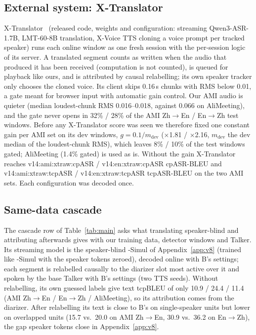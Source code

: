 \subsection{External system: X-Translator}
\label{app:xt}
X-Translator~\citep{zhao2026xtranslator} (released code, weights and configuration: streaming Qwen3-ASR-1.7B, LMT-60-8B
translation, X-Voice TTS cloning a voice prompt per tracked speaker) runs each online window as one fresh session with
the per-session logic of its server. A translated segment counts as written when the audio that produced it has been
received (computation is not counted), is queued for playback like ours, and is attributed by causal relabelling; its
own speaker tracker only chooses the cloned voice. Its client skips 0.16\,s chunks with RMS below 0.01, a gate meant for
browser input with automatic gain control. Our AMI audio is quieter (median loudest-chunk RMS 0.016--0.018, against
0.066 on AliMeeting), and the gate never opens in 32\% / 28\% of the AMI Zh$\rightarrow$En / En$\rightarrow$Zh test
windows. Before any X-Translator score was seen we therefore fixed one constant gain per AMI set on its dev windows, $g=0.1/m_\text{dev}$
($\times$1.81 / $\times$2.16, $m_\text{dev}$ the dev median of the loudest-chunk RMS), which leaves 8\% / 10\% of the
test windows gated; AliMeeting (1.4\% gated) is used as is. Without the gain X-Translator reaches
\num{v14:ami:xtraw:cpASR} / \num{v14:en:xtraw:cpASR} cpASR-BLEU and \num{v14:ami:xtraw:tcpASR} /
\num{v14:en:xtraw:tcpASR} tcpASR-BLEU on the two AMI sets. Each configuration was decoded once.
\fi

\ifCascade
\subsection{Same-data cascade}
\label{app:cascade}
The cascade row of Table~\ref{tab:main} asks what translating speaker-blind and attributing afterwards gives with
our training data, detector windows and Talker. Its streaming model is the speaker-blind \sys{}-Simul of
Appendix~\ref{app:v8} (trained like \sys{}-Simul with the speaker tokens zeroed), decoded online with B's settings; each
segment is relabelled causally to the diarizer slot most active over it and spoken by the base Talker with B's settings
(two TTS seeds). Without relabelling, its own guessed labels give text tcpBLEU of only 10.9 / 24.4 / 11.4 (AMI
Zh$\rightarrow$En / En$\rightarrow$Zh / AliMeeting), so its attribution comes from the diarizer. After relabelling its
text is close to B's on single-speaker units but lower on overlapped units (15.7 vs.\ 20.0 on AMI Zh$\rightarrow$En,
30.9 vs.\ 36.2 on En$\rightarrow$Zh), the gap speaker tokens close in Appendix~\ref{app:v8}.
\fi

